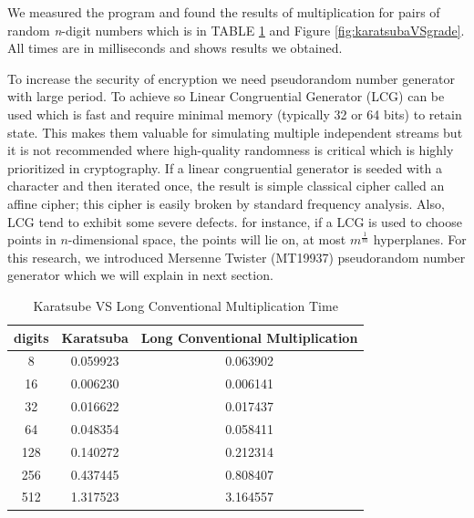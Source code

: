 \documentclass[12pt,journal,compsoc]{IEEEtran}
\begin{document}
We measured the program and found the results of multiplication for pairs of random \emph{n}-digit numbers which is in TABLE \ref{table:karatsubaVSgrade} and Figure \ref{fig:karatsubaVSgrade}. All times are in milliseconds and  shows results we obtained.

To increase the security of encryption we need pseudorandom number generator with large period. To achieve so Linear Congruential Generator (LCG)\cite{lcg_cryptography} can be used which is fast and require minimal memory (typically 32 or 64 bits) to retain state. This makes them valuable for simulating multiple independent streams but it is not recommended where high-quality randomness is critical which is highly prioritized in cryptography. If a linear congruential generator is seeded with a character and then iterated once, the result is simple classical cipher called an affine cipher\cite{affine_cipher}; this cipher is easily broken by standard frequency analysis. Also, LCG tend to exhibit some severe defects. for instance, if a LCG is used to choose points in $n$-dimensional space, the points will lie on, at most $m^{\frac{1}{m}}$ hyperplanes\cite{marsaglia_theorem}. For this research, we introduced Mersenne Twister (MT19937) pseudorandom number generator which we will explain in next section.


\begin{table}[ht]
	\begin{center}
	\begin{tabular}{|c|c|c|}
    	\hline
       		digits 	&		Karatsuba					&	Long Conventional Multiplication\\
	\hline
    		8		&		0.059923					&	0.063902 \\
		16		&		0.006230					&	0.006141 \\
		32		&		0.016622					&	0.017437 \\
		64		&		0.048354					&	0.058411 \\
		128		&		0.140272					&	0.212314 \\
		256		&		0.437445					&	0.808407 \\
		512		&		1.317523					&	3.164557 \\
	\hline
	\end{tabular}
	\end{center}
	\caption{Karatsube VS Long Conventional Multiplication Time}
	\label{table:karatsubaVSgrade}

\end{table}
\end{document}

